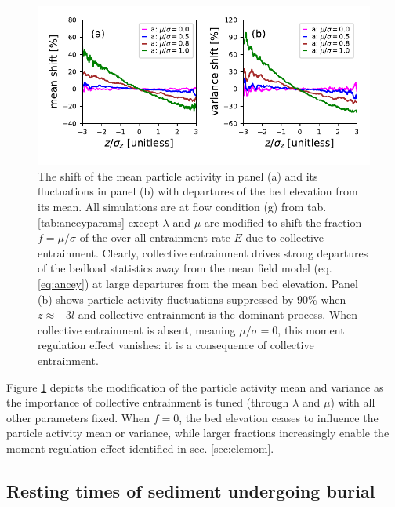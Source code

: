 \begin{figure}[!htbp]
	\includegraphics[width=\linewidth,keepaspectratio]{./figures/ch3/colent-suppression.pdf}
	\caption{The shift of the mean particle activity in panel (a) and its fluctuations in panel (b) with departures of the bed elevation from its mean. All simulations are at flow condition (g) from tab. \ref{tab:anceyparams} except $\lambda$ and $\mu$ are modified to shift the fraction $f=\mu/\sigma$ of the over-all entrainment rate $E$ due to collective entrainment. Clearly, collective entrainment drives strong departures of the bedload statistics away from the mean field model (eq. \ref{eq:ancey}) at large departures from the mean bed elevation. Panel (b) shows particle activity fluctuations suppressed by 90\% when $z\approx -3l$ and collective entrainment is the dominant process. When collective entrainment is absent, meaning $\mu/\sigma=0$, this moment regulation effect vanishes: it is a consequence of collective entrainment.}
	\label{fig:colent}
\end{figure}
Figure \ref{fig:colent} depicts the modification of the particle activity mean and variance as the importance of collective entrainment is tuned (through $\lambda$ and $\mu$) with all other parameters fixed. When $f=0$, the bed elevation ceases to influence the particle activity mean or variance, while larger fractions increasingly enable the moment regulation effect identified in sec. \ref{sec:elemom}.

\subsection{Resting times of sediment undergoing burial}
\label{sec:elertcdf}

